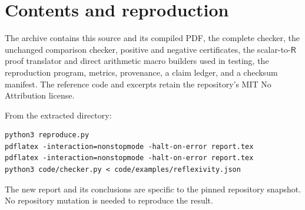 \documentclass[11pt]{article}
\theoremstyle{definition}
\theoremstyle{remark}
\newcommand{\R}{\mathsf R}
\begin{document}
\section{Contents and reproduction}

The archive contains this source and
its compiled PDF, the complete checker,
the unchanged comparison checker,
positive and negative certificates,
the scalar-to-$\R$ proof translator
and direct arithmetic macro builders
used in testing, the reproduction
program, metrics, provenance, a
claim ledger, and a checksum manifest.
The reference code and excerpts
retain the repository's MIT No
Attribution license.

From the extracted directory:
\begin{lstlisting}[language={}]
python3 reproduce.py
pdflatex -interaction=nonstopmode -halt-on-error report.tex
pdflatex -interaction=nonstopmode -halt-on-error report.tex
python3 code/checker.py < code/examples/reflexivity.json
\end{lstlisting}

The new report and its conclusions
are specific to the pinned repository
snapshot. No repository mutation is
needed to reproduce the result.
\end{document}
